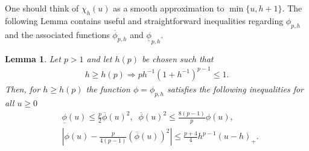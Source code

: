 \documentclass[12pt,american]{amsart}
\numberwithin{equation}{section}
\theoremstyle{plain}
\newtheorem{lem}[thm]{Lemma}
\theoremstyle{definition}                  %
\begin{document}
  One should think of $\chi_h(u)$ as a smooth approximation to $\min\{u,h+1\}$.  The following Lemma contains useful and straightforward inequalities regarding $\phi_{p,h}$ and the associated functions $\overline{\phi}_{p,h}$ and $\underline{\phi}_{p,h}$. 

  \begin{lem}\label{lem:properties of approximations to p-th power}
    Let $p>1$ and let $h(p)$ be chosen such that 	  
    \begin{align*}
      h\geq h(p) \Rightarrow p h^{-1}(1+h^{-1})^{p-1} \leq 1.
    \end{align*}   
    Then, for $h\geq h(p)$ the function $\phi = \phi_{p,h}$ satisfies the following inequalities for all $u\geq 0$
    \begin{align}
      & \underline{\phi}(u)  \leq \frac{p}{2}\overline{\phi}(u)^2,\;\; \overline{\phi}(u)^2 \leq \frac{8(p-1)}{p} \phi(u), \label{eqn:upper bounds for under and over bar phi}\\
      & |\phi(u)- \frac{p}{4(p-1)}(\overline{\phi}(u))^2| \leq \frac{p+4}{4} h^{p-1}(u-h)_+. \label{eqn:bound difference phi and overline phi}
    \end{align}
	
  \end{lem}
\end{document}

